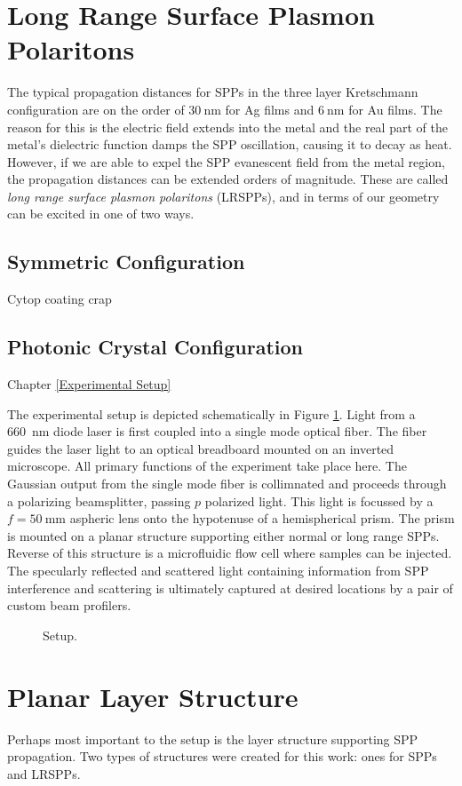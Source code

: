 \documentclass[a4paper,titlepage,onecolumn]{report}
\newcommand{\Figure}[1]{Figure \ref{#1}}
\newcommand{\Chapter}[1]{Chapter \ref{#1}}
\begin{document}
\section{Long Range Surface Plasmon Polaritons}
The typical propagation distances for SPPs in the three layer Kretschmann
configuration are on the order of $\SI{30}{\nano\meter}$ for Ag films and
$\SI{6}{\nano\meter}$ for Au films.  The reason for this is the electric
field extends into the metal and the real part of the metal's dielectric
function damps the SPP oscillation, causing it to decay as heat.  However,
if we are able to expel the SPP evanescent field from the metal region, the
propagation distances can be extended orders of magnitude.  These are
called \textit{long range surface plasmon polaritons} (LRSPPs), and in
terms of our geometry can be excited in one of two ways.

\subsection{Symmetric Configuration}
Cytop coating crap
\subsection{Photonic Crystal Configuration}

\Chapter{Experimental Setup}

The experimental setup is depicted schematically in
\Figure{fig:sppexperimentalsetup}.  Light from a \SI{660}{\nano\meter}
diode laser is first coupled into a single mode optical fiber.  The fiber
guides the laser light to an optical breadboard mounted on an inverted
microscope.  All primary functions of the experiment take place here.  The
Gaussian output from the single mode fiber is collimnated and proceeds
through a polarizing beamsplitter, passing $p$ polarized light.  This light
is focussed by a $f=\SI{50}{\milli\meter}$ aspheric lens onto the
hypotenuse of a hemispherical prism.  The prism is mounted on a planar
structure supporting either normal or long range SPPs.  Reverse of this
structure is a microfluidic flow cell where samples can be injected.  The
specularly reflected and scattered light containing information from SPP
interference and scattering is ultimately captured at desired locations by
a pair of custom beam profilers.
\begin{figure}
 \caption{Setup.}
 \label{fig:sppexperimentalsetup}
\end{figure}

\section{Planar Layer Structure}
Perhaps most important to the setup is the layer structure supporting SPP
propagation.  Two types of structures were created for this work: ones for
SPPs and LRSPPs.
\end{document}
